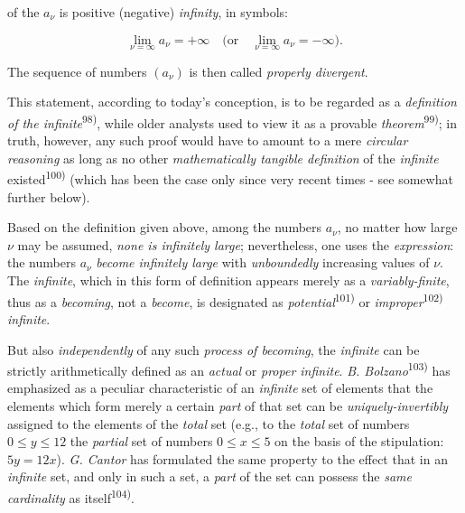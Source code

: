 \thispagestyle{fancy}

\vspace{0.5cm}

of the $a_\nu$ is positive (negative) \textit{infinity}, in symbols:

\vspace{-0.2cm}
$$\lim_{\nu=\infty} a_\nu = +\infty \quad \text{(or} \quad \lim_{\nu=\infty} a_\nu = -\infty\text{).}$$

The sequence of numbers $(a_\nu)$ is then called \textit{properly divergent}.

This statement, according to today's conception, is to be regarded as a \textit{definition of the infinite}\textsuperscript{98)}, while older analysts used to view it as a provable \textit{theorem}\textsuperscript{99)}; in truth, however, any such proof would have to amount to a mere \textit{circular reasoning} as long as no other \textit{mathematically tangible definition} of the \textit{infinite} existed\textsuperscript{100)} (which has been the case only since very recent times - see somewhat further below).

Based on the definition given above, among the numbers $a_\nu$, no matter how large $\nu$ may be assumed, \textit{none is infinitely large}; nevertheless, one uses the \textit{expression}: the numbers $a_\nu$ \textit{become infinitely large} with \textit{unboundedly} increasing values of $\nu$. The \textit{infinite}, which in this form of definition appears merely as a \textit{variably-finite}, thus as a \textit{becoming}, not a \textit{become}, is designated as \textit{potential}\textsuperscript{101)} or \textit{improper}\textsuperscript{102)} \textit{infinite}.

But also \textit{independently} of any such \textit{process of becoming}, the \textit{infinite} can be strictly arithmetically defined as an \textit{actual} or \textit{proper infinite}. \textit{B. Bolzano}\textsuperscript{103)} has emphasized as a peculiar characteristic of an \textit{infinite} set of elements that the elements which form merely a certain \textit{part} of that set can be \textit{uniquely-invertibly} assigned to the elements of the \textit{total} set (e.g., to the \textit{total} set of numbers $0 \leq y \leq 12$ the \textit{partial} set of numbers $0 \leq x \leq 5$ on the basis of the stipulation: $5y = 12x$). \textit{G. Cantor} has formulated the same property to the effect that in an \textit{infinite} set, and only in such a set, a \textit{part} of the set can possess the \textit{same cardinality} as itself\textsuperscript{104)}.

